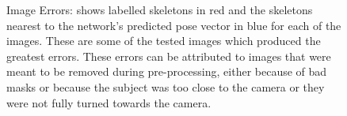\documentclass[11pt]{article} %
\begin{document}
\begin{figure}
\centering
{}
\qquad%
%
\caption{Image Errors: shows labelled skeletons in red and the skeletons nearest to the network's predicted pose vector in blue for each of the images. These are some of the tested images which produced the greatest errors. These errors can be attributed to images that were meant to be removed during pre-processing, either because of bad masks or because the subject was too close to the camera or they were not fully turned towards the camera.}
\label{fig:badImages}
\end{figure}
\end{document}
